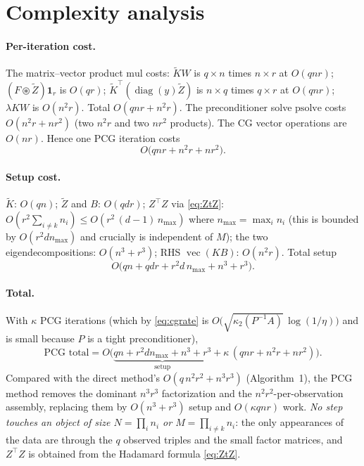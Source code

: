 \documentclass[12pt]{article}
\DeclareMathOperator{\vecop}{vec}
\DeclareMathOperator{\diag}{diag}
\newcommand{\tZ}{\tilde{Z}}
\newcommand{\tK}{\tilde{K}}
\begin{document}
\section{Complexity analysis}\label{sec:complexity}

\paragraph{Per-iteration cost.}
The matrix--vector product $\mathrm{mul}$ costs:
$\tK W$ is $q\times n$ times $n\times r$ at $O(qnr)$;
$(F\circledast\tZ)\mathbf1_r$ is $O(qr)$;
$\tK^{\top}(\diag(y)\tZ)$ is $n\times q$ times $q\times r$ at $O(qnr)$;
$\lambda KW$ is $O(n^2r)$. Total $O(qnr+n^2r)$.
The preconditioner solve $\mathrm{psolve}$ costs $O(n^2r+nr^2)$
(two $n^2r$ and two $nr^2$ products). The CG vector operations are
$O(nr)$. Hence one PCG iteration costs
\begin{equation}\label{eq:periter}
  O\big(qnr+n^2r+nr^2\big).
\end{equation}

\paragraph{Setup cost.}
$\tK$: $O(qn)$; $\tZ$ and $B$: $O(qdr)$; $Z^{\top}Z$ via \eqref{eq:ZtZ}:
$O(r^2\sum_{i\neq k}n_i)\le O(r^2\,(d-1)\,n_{\max})$ where $n_{\max}=\max_i
n_i$ (this is bounded by $O(r^2 dn_{\max})$ and crucially is independent
of $M$); the two eigendecompositions: $O(n^3+r^3)$; RHS $\vecop(KB)$:
$O(n^2r)$. Total setup
\begin{equation}\label{eq:setup}
  O\big(qn+qdr+r^2 d\,n_{\max}+n^3+r^3\big).
\end{equation}

\paragraph{Total.}
With $\kappa$ PCG iterations (which by \eqref{eq:cgrate} is
$O\!\big(\sqrt{\kappa_2(P^{-1}A)}\,\log(1/\eta)\big)$ and is small because
$P$ is a tight preconditioner),
\begin{equation}\label{eq:total}
  \text{PCG total}=
  O\Big(\underbrace{qn+r^2 dn_{\max}+n^3+r^3}_{\text{setup}}
        +\kappa\,(qnr+n^2r+nr^2)\Big).
\end{equation}
Compared with the direct method's $O(q\,n^2r^2+n^3r^3)$
(Algorithm~1), the PCG method removes the dominant $n^3r^3$ factorization
and the $n^2r^2$-per-observation assembly, replacing them by
$O(n^3+r^3)$ setup and $O(\kappa qnr)$ work. \emph{No step touches an
object of size $N=\prod_i n_i$ or $M=\prod_{i\neq k}n_i$}: the only
appearances of the data are through the $q$ observed triples and the small
factor matrices, and $Z^{\top}Z$ is obtained from the Hadamard formula
\eqref{eq:ZtZ}.
\end{document}
